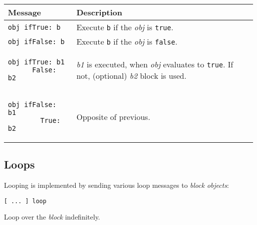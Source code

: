 \documentclass[10pt]{article}
\begin{document}
\begin{multicols*}{3}
\vspace*{0.2cm}

\small{\begin{tabular}{ p{70pt} p{140pt} l l }
Message & Description
\\\hline\hline

\texttt{obj ifTrue: b}
&
Execute \texttt{b} if the \textit{obj} is \texttt{true}.
\\\hline %

\texttt{obj\ ifFalse:\ b}
&
Execute \texttt{b} if the \textit{obj} is \texttt{false}.
\\\hline %

\nointerlineskip
\begin{lstlisting}[aboveskip=0pt,belowskip=-0.8 \baselineskip]
obj ifTrue: b1
      False: b2
\end{lstlisting}
&
\textit{b1} is executed, when \textit{obj} evaluates to \texttt{true}.
If not, (optional) \textit{b2} block is used.
\\\hline %

\nointerlineskip
\begin{lstlisting}[aboveskip=-8pt,belowskip=-0.8 \baselineskip]
obj ifFalse: b1
        True: b2
\end{lstlisting}
&
Opposite of previous.
\\ %
\end{tabular}}




\subsection{Loops}
Looping is implemented by sending various loop messages to \textit{block objects}:

\begin{lstlisting}
[ ... ] loop
\end{lstlisting}
Loop over the \textit{block} indefinitely.


\end{multicols*}
\end{document}
